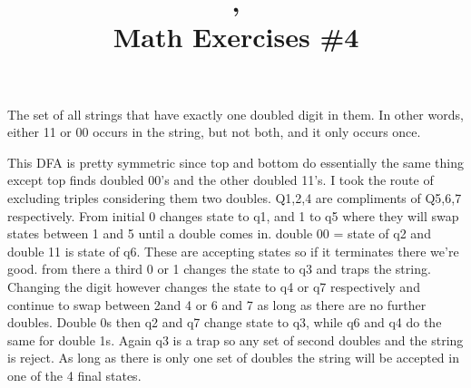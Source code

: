 \documentclass{article}
\title{\course, \term\\Math Exercises \#4}
\begin{document}
\maketitle

\question%
The set of all strings that have exactly one doubled digit in them.  In other
words, either 11 or 00 occurs in the string, but not both, and it only occurs
once.
\begin{center}
\end{center}
\answer This DFA is pretty symmetric since top and bottom do essentially the same thing 
except top finds doubled 00's and the other doubled 11's. I took the route of excluding 
triples considering them two doubles. Q1,2,4 are compliments of Q5,6,7 respectively. From initial 0 changes state to q1, and 1 to q5 where they will swap states between 1 and 5 until a double comes in. double 00 = state of q2 and double 11 is state of q6. These are accepting states so if it terminates there we're good. from there a third 0 or 1 changes the state to q3 and traps the string. Changing the digit however changes the state to q4 or q7 respectively and continue to swap between 2and 4 or 6 and 7 as long as there are no further doubles. Double 0s then q2 and q7 change state to q3, while q6 and q4 do the same for double 1s. Again q3 is a trap so any set of second doubles and the string is reject. As long as there is only one set of doubles the string will be accepted in one of the 4 final states.\\
\end{document}
